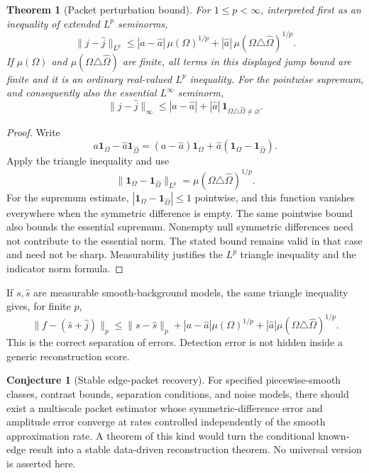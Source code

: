 \documentclass[11pt,letterpaper]{article}
\newtheorem{theorem}{Theorem}[section]
\theoremstyle{plain}
\theoremstyle{plain}
\theoremstyle{plain}
\theoremstyle{definition}
\theoremstyle{definition}
\theoremstyle{definition}
\theoremstyle{definition}
\newtheorem{conjecture}[conjecture]{Conjecture}
\theoremstyle{remark}
\theoremstyle{remark}
\theoremstyle{remark}
\theoremstyle{remark}
\let\KomorebiPrimitiveWidehat\widehat
\renewcommand{\widehat}[1]{\KomorebiPrimitiveWidehat{#1}}
\begin{document}
\begin{theorem}[Packet perturbation bound]\label{result:12}
For $1\le p<\infty$, interpreted first as an inequality of extended $L^p$ seminorms,
\[
\boxed{
\|j-\widehat j\|_{L^p}
\le
|a-\widehat a|\,\mu(\Omega)^{1/p}
+
|\widehat a|\,\mu(\Omega\triangle\widehat\Omega)^{1/p}.
}
\]
If $\mu(\Omega)$ and $\mu(\Omega\triangle\widehat\Omega)$ are finite, all terms in this displayed jump bound are finite and it is an ordinary real-valued $L^p$ inequality. For the pointwise supremum, and consequently also the essential $L^\infty$ seminorm,
\[
\|j-\widehat j\|_{\infty}
\le |a-\widehat a|+|\widehat a|\,
\mathbf 1_{\Omega\triangle\widehat\Omega\ne\varnothing}.
\]
\end{theorem}

\begin{proof}
Write
\[
a\mathbf 1_{\Omega}-\widehat a\mathbf 1_{\widehat\Omega}
=(a-\widehat a)\mathbf 1_{\Omega}
+\widehat a(\mathbf 1_{\Omega}-\mathbf 1_{\widehat\Omega}).
\]
Apply the triangle inequality and use
\[
\|\mathbf 1_{\Omega}-\mathbf 1_{\widehat\Omega}\|_{L^p}
=\mu(\Omega\triangle\widehat\Omega)^{1/p}.
\]
For the supremum estimate, $|\mathbf1_\Omega-\mathbf1_{\widehat\Omega}|\le1$ pointwise, and this function vanishes everywhere when the symmetric difference is empty. The same pointwise bound also bounds the essential supremum. Nonempty null symmetric differences need not contribute to the essential norm. The stated bound remains valid in that case and need not be sharp. Measurability justifies the $L^p$ triangle inequality and the indicator norm formula.
\end{proof}

If $s,\widehat s$ are measurable smooth-background models, the same triangle inequality gives, for finite $p$,
\[
\boxed{
\|f-(\widehat s+\widehat j)\|_p
\le
\|s-\widehat s\|_p
+|a-\widehat a|\mu(\Omega)^{1/p}
+|\widehat a|\mu(\Omega\triangle\widehat\Omega)^{1/p}.
}
\]
This is the correct separation of errors. Detection error is not hidden inside a generic reconstruction score.

\begin{conjecture}[Stable edge-packet recovery]\label{core:record:17}
For specified piecewise-smooth classes, contrast bounds, separation conditions, and noise models, there should exist a multiscale packet estimator whose symmetric-difference error and amplitude error converge at rates controlled independently of the smooth approximation rate. A theorem of this kind would turn the conditional known-edge result into a stable data-driven reconstruction theorem. No universal version is asserted here.
\end{conjecture}
\end{document}
